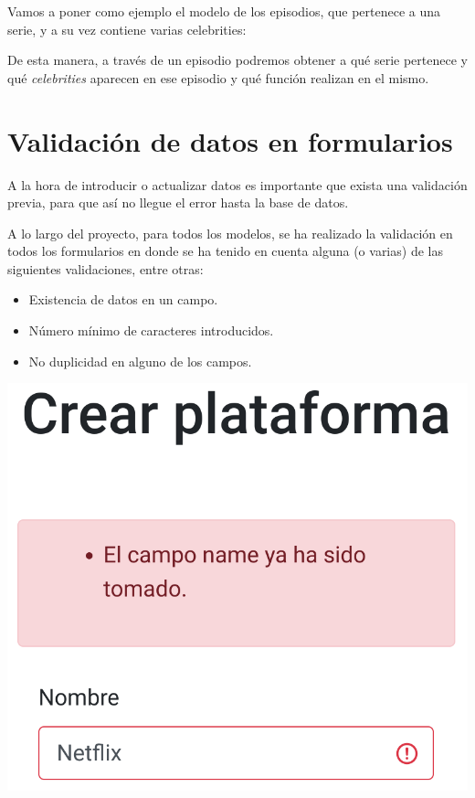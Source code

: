 \documentclass{\ClassPath/viu-tfm-template}
\begin{document}
Vamos a poner como ejemplo el modelo de los episodios, que pertenece a una serie, y a su vez contiene varias celebrities:


De esta manera, a través de un episodio podremos obtener a qué serie pertenece y qué \textit{celebrities} aparecen en ese episodio y qué función realizan en el mismo.


\section{Validación de datos en formularios}
A la hora de introducir o actualizar datos es importante que exista una validación previa, para que así no llegue el error hasta la base de datos.

A lo largo del proyecto, para todos los modelos, se ha realizado la validación en todos los formularios en donde se ha tenido en cuenta alguna (o varias) de las siguientes validaciones, entre otras:

\vspace{-1em}
\begin{itemize}
    \item Existencia de datos en un campo.
    \item Número mínimo de caracteres introducidos.
    \item No duplicidad en alguno de los campos.
\end{itemize}
\vspace{-1em}

\begin{center}
    \includegraphics[frame,width=0.5\linewidth]{img/validacion.png}
\end{center}
\end{document}
